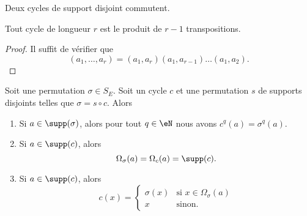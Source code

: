 \begin{lemma}       \label{LEMooWXXLooIzrwJT}
	Deux cycles de support disjoint commutent.
\end{lemma}

\begin{lemma}     \label{LEMooVVPWooMkRjyR}
	Tout cycle de longueur \( r\) est le produit de \( r-1\) transpositions.
\end{lemma}

\begin{proof}
	Il suffit de vérifier que
	\begin{equation}
		(a_1,\ldots, a_r)=(a_1, a_r)(a_1, a_{r-1})\ldots (a_1, a_2).
	\end{equation}
\end{proof}

\begin{lemma}        \label{LEMooGGLUooUSzuAx}
	Soit une permutation \( \sigma\in S_E\). Soit un cycle \( c\) et une permutation \( s\) de supports disjoints telles que \( \sigma=s\circ c\). Alors
	\begin{enumerate}
		\item       \label{LEMooUHWTooFptoZU}
		      Si \( a\in\supp(\sigma)\), alors pour tout \( q\in \eN\) nous avons \( c^q(a)=\sigma^q(a)\).
		\item       \label{ITEMooHSDLooIAKYZA}
		      Si \( a\in\supp(c)\), alors
		      \begin{equation}
			      \Omega_{\sigma}(a)=\Omega_c(a)=\supp(c).
		      \end{equation}
		\item
		      Si \( a\in\supp(c)\), alors
		      \begin{equation}
			      c(x)=\begin{cases}
				      \sigma(x) & \text{si } x\in\Omega_{\sigma}(a) \\
				      x         & \text{sinon. }
			      \end{cases}
		      \end{equation}
	\end{enumerate}
\end{lemma}

